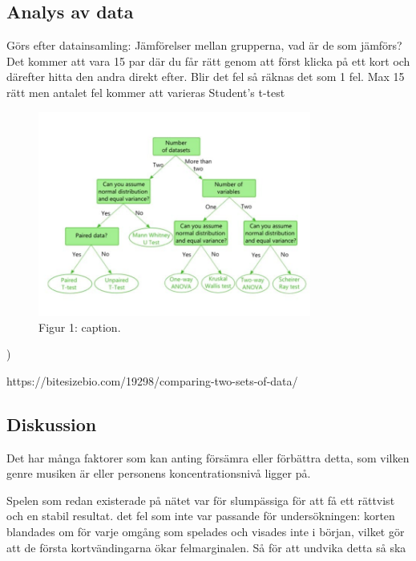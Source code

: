 \documentclass[11p]{article}
\begin{document}
    \subsection{Analys av data}
    Görs efter datainsamling:
    Jämförelser mellan grupperna, vad är de som jämförs?
    Det kommer att vara 15 par där du får rätt genom att först klicka på ett kort och därefter hitta den andra direkt efter.
    Blir det fel så räknas det som 1 fel.
    Max 15 rätt men antalet fel kommer att varieras
    Student’s t-test

    \begin{figure}
        \includegraphics[width=0.8\textwidth]{../images/data.jpg}
        \caption{Figur 1: caption. }
    \end{figure})

    https://bitesizebio.com/19298/comparing-two-sets-of-data/


    \subsection{Diskussion}
    Det har många faktorer som kan anting försämra eller förbättra detta, som vilken genre musiken är eller personens koncentrationsnivå ligger på.

    Spelen som redan existerade på nätet var för slumpässiga för att få ett rättvist och en stabil resultat.
    det fel som inte var passande för undersökningen: korten blandades om för varje omgång som spelades och visades inte i början, vilket gör att de första kortvändingarna ökar felmarginalen.
    Så för att undvika detta så ska

    \printbibliography
\end{document}
